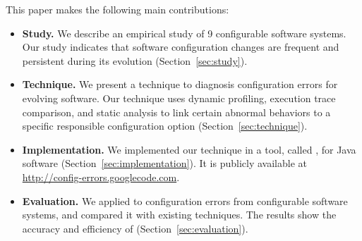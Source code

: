 This paper makes the following main contributions:

\begin{itemize}
\vspace{-3mm}
\item \textbf{Study.} We describe an empirical
study of 9 configurable software systems.
Our study indicates that software configuration changes
are frequent and persistent during its evolution (Section~\ref{sec:study}).

\item \textbf{Technique.} We present a technique to diagnosis
configuration errors for evolving software. Our technique
uses dynamic profiling, execution trace comparison, and
static analysis to link certain abnormal behaviors to a
specific responsible configuration option (Section~\ref{sec:technique}).

\item \textbf{Implementation.} We implemented our technique
in a tool, called \ourtool, for Java software (Section~\ref{sec:implementation}).
It is publicly available at \url{http://config-errors.googlecode.com}.

\item \textbf{Evaluation.} We applied \ourtool to \errornum configuration
errors from \subjnum configurable software systems,
and compared it with existing techniques.
The results show the accuracy and efficiency of \ourtool (Section~\ref{sec:evaluation}).
\end{itemize}
